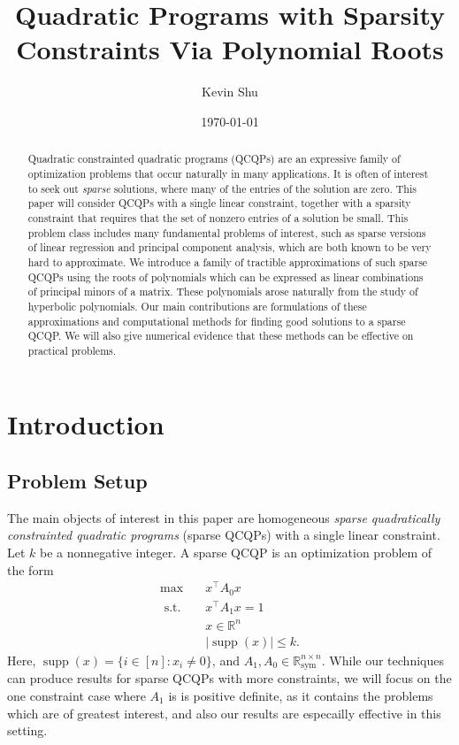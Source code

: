 \documentclass{amsart}
\title{Quadratic Programs with Sparsity Constraints Via Polynomial Roots}
\date{\today}
\author{Kevin Shu}
\theoremstyle{definition}
\newcommand{\R}{\mathbb{R}}
\DeclareMathOperator*{\supp}{supp}
\newcommand{\st}{{\text{ s.t. }}}
\newcommand*{\Sym}{\R^{n \times n}_{\mathrm{sym}}}
\begin{document}
\begin{abstract}
    Quadratic constrainted quadratic programs (QCQPs) are an expressive family of optimization problems that occur naturally in many applications.
    It is often of interest to seek out \emph{sparse} solutions, where many of the entries of the solution are zero.
    This paper will consider QCQPs with a single linear constraint, together with a sparsity constraint that requires that the set of nonzero entries of a solution be small.
    This problem class includes many fundamental problems of interest, such as sparse versions of linear regression and principal component analysis, which are both known to be very hard to approximate.
    We introduce a family of tractible approximations of such sparse QCQPs using the roots of polynomials which can be expressed as linear combinations of principal minors of a matrix.
    These polynomials arose naturally from the study of hyperbolic polynomials.
    Our main contributions are formulations of these approximations and computational methods for finding good solutions to a sparse QCQP.
    We will also give numerical evidence that these methods can be effective on practical problems.
\end{abstract}

\maketitle

\section{Introduction}
\subsection{Problem Setup}
The main objects of interest in this paper are homogeneous \emph{sparse quadratically constrainted quadratic programs} (sparse QCQPs) with a single linear constraint. Let $k$ be a nonnegative integer. A sparse QCQP is an optimization problem of the form
\begin{equation}\label{eq:sparse_qcqp_orig}
    \begin{aligned}
        \max\quad & x^{\intercal}A_0x\\
        \st & x^{\intercal}A_1x = 1\\
            & x \in \R^n\\
            &|\supp(x)| \le k.
    \end{aligned}
    \tag{$QCQP$}
\end{equation}
Here, $\supp(x) = \{i \in [n] : x_i \neq 0\}$, and $A_1, A_0 \in \Sym$.
While our techniques can produce results for sparse QCQPs with more constraints, we will focus on the one constraint case where $A_1$ is is positive definite, as it contains the problems which are of greatest interest, and also our results are especailly effective in this setting.
\end{document}

